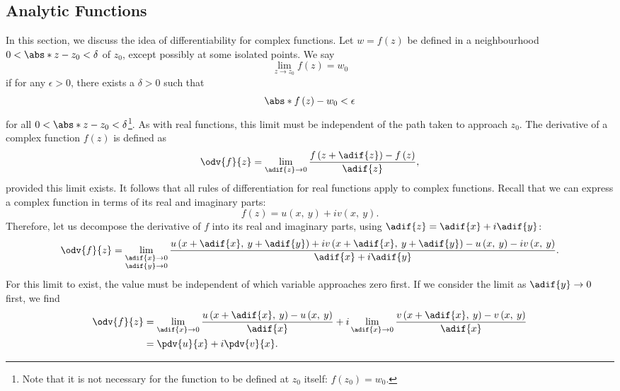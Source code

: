 \documentclass{article}
\begin{document}
\subsection{Analytic Functions}
In this section, we discuss the idea of differentiability for complex
functions. Let \(w = f\left( z \right)\) be defined in a neighbourhood
\(0 < \abs*{z - z_0} < \delta\) of \(z_0\), except possibly at some
isolated points. We say
\begin{equation*}
    \lim_{z \to z_0} f\left( z \right) = w_0
\end{equation*}
if for any \(\epsilon > 0\), there exists a \(\delta > 0\) such that
\begin{equation*}
    \abs*{f\left( z \right) - w_0} < \epsilon
\end{equation*}
for all \(0 < \abs*{z - z_0} < \delta\)\footnote{Note that it is not
necessary for the function to be defined at \(z_0\) itself: \(f\left( z_0 \right)
= w_0\).}. As with real functions, this limit must be independent of the
path taken to approach \(z_0\). The derivative of a complex function
\(f\left( z \right)\) is defined as
\begin{equation*}
    \odv{f}{z} = \lim_{\adif{z} \to 0} \frac{f\left( z + \adif{z} \right) - f\left( z \right)}{\adif{z}},
\end{equation*}
provided this limit exists. It follows that all rules of differentiation
for real functions apply to complex functions. Recall that we can
express a complex function in terms of its real and imaginary parts:
\begin{equation*}
    f\left( z \right) = u\left( x,\: y \right) + i v\left( x,\: y \right).
\end{equation*}
Therefore, let us decompose the derivative of \(f\) into its real and
imaginary parts, using \(\adif{z} = \adif{x} + i \adif{y}\):
\begin{equation*}
    \odv{f}{z} = \lim_{\substack{\adif{x} \to 0 \\ \adif{y} \to 0}} \frac{u\left( x + \adif{x},\: y + \adif{y} \right) + i v\left( x + \adif{x},\: y + \adif{y} \right) - u\left( x,\: y \right) - i v\left( x,\: y \right)}{\adif{x} + i \adif{y}}.
\end{equation*}
For this limit to exist, the value must be independent of which variable
approaches zero first. If we consider the limit as \(\adif{y} \to 0\)
first, we find
\begin{align*}
    \odv{f}{z} & = \lim_{\adif{x} \to 0} \frac{u\left( x + \adif{x},\: y \right) - u\left( x,\: y \right)}{\adif{x}} + i \lim_{\adif{x} \to 0} \frac{v\left( x + \adif{x},\: y \right) - v\left( x,\: y \right)}{\adif{x}} \\
               & = \pdv{u}{x} + i \pdv{v}{x}.
\end{align*}
\end{document}
